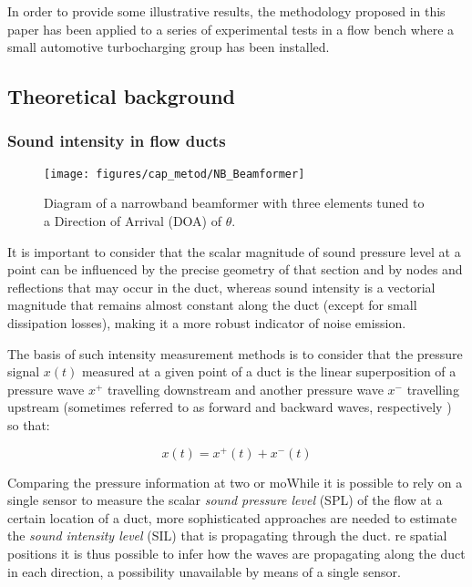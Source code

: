 In order to provide some illustrative results, the methodology proposed in this paper has been applied to a series of experimental tests in a flow bench where a small automotive turbocharging group has been installed.

\subsection{Theoretical background}
\label{sec:theory}

\subsubsection{Sound intensity in flow ducts}
\label{sub:sound_intensity_in_flow_ducts}

\begin{figure}[h!]
\centering
\texttt{[image: figures/cap\_metod/NB\_Beamformer]}
\caption{Diagram of a narrowband beamformer with three elements tuned to a Direction of Arrival (DOA) of $\theta$.}
\label{fig:schematic}
\end{figure}


It is important to consider that the scalar magnitude of sound pressure level at a point can be influenced by the precise geometry of that section and by nodes and reflections that may occur in the duct, whereas sound intensity is a vectorial magnitude that remains almost constant along the duct (except for small dissipation losses), making it a more robust indicator of noise emission.

The basis of such intensity measurement methods is to consider that the pressure signal $x(t)$ measured at a given point of a duct is the linear superposition of a pressure wave $x^+$ travelling downstream and another pressure wave $x^-$ travelling upstream (sometimes referred to as forward and backward waves, respectively \cite{pinero2000estimation}) so that:

\begin{equation}
  x(t)=x^+(t)+x^-(t)
\end{equation}

Comparing the pressure information at two or moWhile it is possible \cite{figurella2012noise} to rely on a single sensor to measure the scalar \emph{sound pressure level} (SPL) of the flow at a certain location of a duct, more sophisticated approaches are needed to estimate the \emph{sound intensity level} (SIL) that is propagating through the duct.
re spatial positions it is thus possible to infer how the waves are propagating along the duct in each direction, a possibility unavailable by means of a single sensor.

